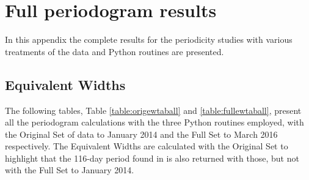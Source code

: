 \chapter{Full periodogram results} %
\protect\label{chapter:pgramdetail}

In this appendix the complete results for the periodicity studies with various treatments of the data and Python
routines are presented.

\section{Equivalent Widths}
\protect\label{section:appewtab}

The following tables, Table \ref{table:origewtaball} and \ref{table:fullewtaball}, present all the periodogram
calculations with the three Python routines employed, with the Original Set of {\harps} data to January 2014 and the
Full Set to March 2016 respectively. The Equivalent Widths are calculated with the Original Set to highlight that the 116-day
period found in \citet{suarezmascareno15} is also returned with those, but not with the Full Set to January 2014.

